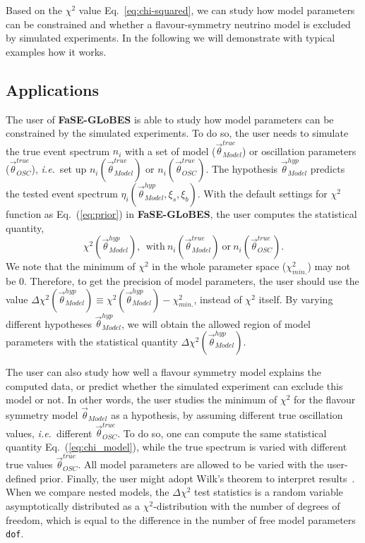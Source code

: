 \documentclass[aps,prd,nofootinbib,preprint]{revtex4}
\begin{document}
Based on the $\chi^2$ value Eq.~\ref{eq:chi-squared}, we can study how model parameters can be constrained and whether a flavour-symmetry neutrino model is excluded by simulated experiments. In the following we will demonstrate with typical examples how it works.

\subsection*{Applications}

The user of \textbf{FaSE-GLoBES} is able to study how model parameters can be constrained by the simulated experiments. To do so, the user needs to simulate the true event spectrum $n_i$ with a set of model ($\vec{\theta}_{Model}^{true}$) or oscillation parameters ($\vec{\theta}_{OSC}^{true}$), \textit{i.e.}~set up $n_i(\vec{\theta}_{Model}^{true})$ or $n_i(\vec{\theta}_{OSC}^{true})$. The hypothesis $\vec{\theta}_{Model}^{hyp}$ predicts the tested event spectrum $\eta_i(\vec{\theta}_{Model}^{hyp},\xi_s,\xi_b)$. With the default settings for $\chi^2$ function as Eq.~(\ref{eq:prior}) in \textbf{FaSE-GLoBES}, the user computes the statistical quantity,
\begin{equation}\label{eq:chi_model}
\chi^2(\vec{\theta}_{Model}^{hyp}),~~\text{with}~n_i(\vec{\theta}_{Model}^{true})~\text{or}~n_i(\vec{\theta}_{OSC}^{true}).
\end{equation}
%
We note that the minimum of $\chi^2$ in the whole parameter space ($\chi^2_{min.}$) may not be $0$. Therefore, to get the precision of model parameters, the user should use the value $\Delta\chi^2(\vec{\theta}_{Model}^{hyp})\equiv \chi^2(\vec{\theta}_{Model}^{hyp})-\chi^2_{min.}$, instead of $\chi^2$ itself. By varying different hypotheses $\vec{\theta}_{Model}^{hyp}$, we will obtain the allowed region of model parameters with the statistical quantity $\Delta\chi^2(\vec{\theta}_{Model}^{hyp})$. 

The user can also study how well a flavour symmetry model explains the computed data, or predict whether the simulated experiment can exclude this model or not. In other words, the user studies the minimum of $\chi^2$ for the flavour symmetry model $\vec{\theta}_{Model}$ as a hypothesis, by assuming different true oscillation values, \textit{i.e.}~different $\vec{\theta}^{true}_{OSC}$. To do so, one can compute the same statistical quantity Eq.~(\ref{eq:chi_model}), while the true spectrum is varied with different true values $\vec{\theta}_{OSC}^{true}$. All model parameters are allowed to be varied with the user-defined prior.
%
Finally, the user might adopt Wilk's theorem to interpret results~\cite{Wilks:1938dza}. When we compare nested models, the $\Delta \chi^2$ test statistics is a random variable asymptotically distributed as a $\chi^2$-distribution with the number of degrees of freedom, which is equal to the difference in the number of free model parameters \texttt{dof}. 
\end{document}
